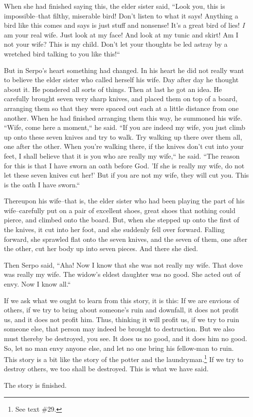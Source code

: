 When she had finished saying this, the elder sister said, ``Look you, this
is impossible--that filthy, miserable bird! Don't listen to what it says! Anything
a bird like this comes and says is just stuff and nonsense! It's a great bird of
lies! \textit{I} am your real wife. Just look at my face! And look at my tunic
and skirt! Am I not your wife? This is my child. Don't let your thoughts be led
astray by a wretched bird talking to you like this!``

But in Serpo's heart something had changed. In his heart he did not really want
to believe the elder sister who called herself his wife. Day after day he thought
about it. He pondered all sorts of things. Then at last he got an idea. He carefully
brought seven very sharp knives, and placed them on top of a board, arranging them
so that they were spaced out each at a little distance from one another. When he
had finished arranging them this way, he summoned his wife. ``Wife, come
here a moment,`` he said. ``If you are indeed my wife, you just
climb up onto these seven knives and try to walk. Try walking up there over them
all, one after the other. When you're walking there, if the knives don't cut into
your feet, I shall believe that it is you who are really my wife,`` he
said. ``The reason for this is that I have sworn an oath before God. 'If
she is really my wife, do not let these seven knives cut her!' But if you are not
my wife, they will cut you. This is the oath I have sworn.``

Thereupon his wife--that is, the elder sister who had been playing the part of
his wife--carefully put on a pair of excellent shoes, great shoes that nothing
could pierce, and climbed onto the board. But, when she stepped up onto the first
of the knives, it cut into her foot, and she suddenly fell over forward. Falling
forward, she sprawled flat onto the seven knives, and the seven of them, one after
the other, cut her body up into seven pieces. And there she died.

Then Serpo said, ``Aha! Now I know that she was not really my wife. That
dove was really my wife. The widow's eldest daughter was no good. She acted out
of envy. Now I know all.``

If we ask what we ought to learn from this story, it is this: If we are envious
of others, if we try to bring about someone's ruin and downfall, it does not profit
us, and it does not profit him. Thus, thinking it will profit us, if we try to
ruin someone else, that person may indeed be brought to destruction. But we also
must thereby be destroyed, you see. It does us no good, and it does him no good.
So, let no man envy anyone else, and let no one bring his fellow-man to ruin. This
story is a bit like the story of the potter and the laundryman.\footnote{See text \#29.} If we try to
destroy others, we too shall be destroyed. This is what we have said.

The story is finished.

